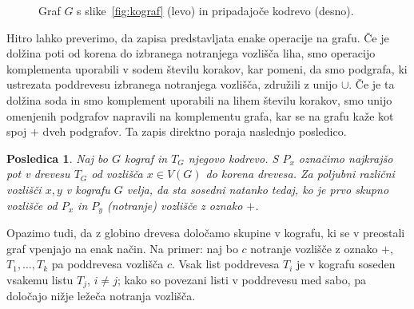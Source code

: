 \documentclass[12pt,a4paper,twoside]{article}
\theoremstyle{definition} %
\theoremstyle{plain} %
\newtheorem{posledica}[definicija]{Posledica}
\numberwithin{equation}{section}  %
\begin{document}
\begin{figure}[h!]
\centering
{}
\hspace{15pt}
\caption{Graf $G$ s slike~\ref{fig:kograf} (levo) in pripadajoče kodrevo (desno).} \label{fig:kodrevo}
\end{figure}

Hitro lahko preverimo, da zapisa predstavljata enake operacije na grafu. Če je dolžina poti od korena do izbranega notranjega vozlišča liha, smo operacijo komplementa uporabili v sodem številu korakov, kar pomeni, da smo podgrafa, ki ustrezata poddrevesu izbranega notranjega vozlišča, združili z unijo $\cup$. Če je ta dolžina soda in smo komplement uporabili na lihem številu korakov, smo unijo omenjenih podgrafov napravili na komplementu grafa, kar se na grafu kaže kot spoj $+$ dveh podgrafov. Ta zapis direktno poraja naslednjo posledico.



\begin{posledica} \label{povezanostVKodrevesu}
Naj bo $G$ kograf in $T_G$ njegovo kodrevo. S $P_x$ označimo najkrajšo pot v drevesu $T_G$ od vozlišča $x \in V(G)$ do korena drevesa. Za poljubni različni vozlišči $x, y$ v kografu $G$ velja, da sta sosedni natanko tedaj, ko je prvo skupno vozlišče od $P_x$ in $P_y$ (notranje) vozlišče z oznako $+$.
\end{posledica}
Opazimo tudi, da z globino drevesa določamo skupine v kografu, ki se v preostali graf vpenjajo na enak način. Na primer: naj bo $c$ notranje vozlišče z oznako $+$, $T_1,\dots, T_k$ pa poddrevesa vozlišča $c$. Vsak list poddrevesa $T_i$ je v kografu soseden vsakemu listu $T_j$, $i \neq j$; kako so povezani listi v poddrevesu med sabo, pa določajo nižje ležeča notranja vozlišča.
\end{document}
